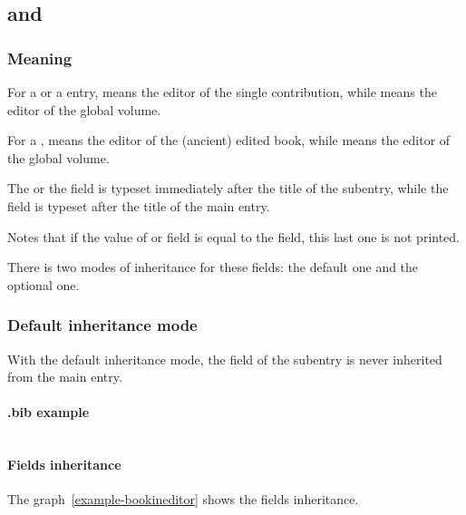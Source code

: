 \documentclass{ltxdockit}[2011/03/25]
\begin{document}
\subsection{ and }
\subsubsection{Meaning}
For a  or a  entry,  means the editor of the single contribution, while  means the editor of the global volume.


For a ,  means the editor of the (ancient) edited book, while  means the editor of the global volume.

The  or the  field is typeset immediately   after the title of the subentry, while the  field is typeset after the title of the main entry.

 


Notes that if the value of  or  field is equal to the  field, this last one is not printed.

There is two modes of inheritance for these fields:  the default one and the optional one.

\subsubsection{Default inheritance mode}

With the default inheritance mode, the  field of the subentry is never inherited from the main entry.
 

\paragraph{.bib example}

\inputminted[breaklines]{latex}{example-bookineditor.bib}

\paragraph{Fields inheritance}

The graph~\ref{example-bookineditor} shows the fields inheritance.
\end{document}
